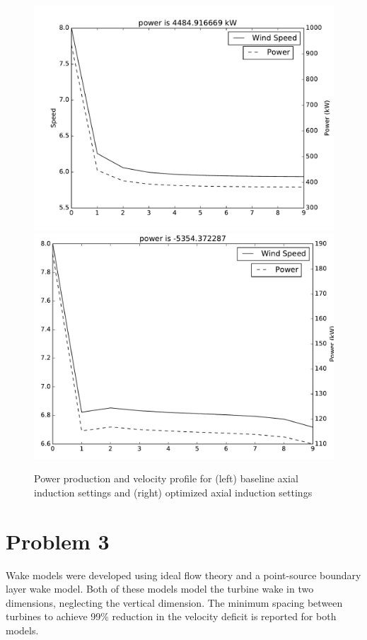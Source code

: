 \documentclass{article}
\begin{document}
\begin{figure}[htb!]
\centering
\includegraphics[scale=.3]{speed}
\includegraphics[scale=.3]{optimized}
\caption{\label{p1} Power production and velocity profile for (left) baseline axial induction settings and (right) optimized axial induction settings}
\end{figure}

\section{Problem 3}
Wake models were developed using ideal flow theory and a point-source boundary layer wake model. Both of these models model the turbine wake in two dimensions, neglecting the vertical dimension. The minimum spacing between turbines to achieve 99\% reduction in the velocity deficit is reported for both models.
\end{document}

